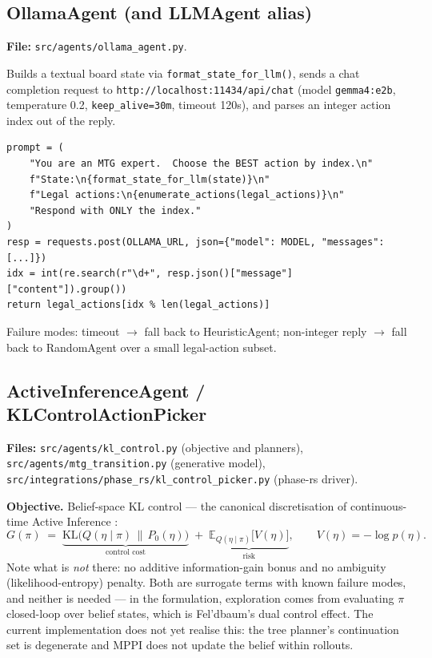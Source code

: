 \documentclass[11pt,a4paper]{article}
\begin{document}
\subsection{OllamaAgent (and LLMAgent alias)}
\textbf{File:} \texttt{src/agents/ollama\_agent.py}.

Builds a textual board state via \texttt{format\_state\_for\_llm()}, sends a
chat completion request to \texttt{http://localhost:11434/api/chat}
(model \texttt{gemma4:e2b}, temperature 0.2, \texttt{keep\_alive=30m},
timeout 120s), and parses an integer action index out of the reply.

\begin{lstlisting}
prompt = (
    "You are an MTG expert.  Choose the BEST action by index.\n"
    f"State:\n{format_state_for_llm(state)}\n"
    f"Legal actions:\n{enumerate_actions(legal_actions)}\n"
    "Respond with ONLY the index."
)
resp = requests.post(OLLAMA_URL, json={"model": MODEL, "messages": [...]})
idx = int(re.search(r"\d+", resp.json()["message"]["content"]).group())
return legal_actions[idx % len(legal_actions)]
\end{lstlisting}
%
Failure modes: timeout $\to$ fall back to HeuristicAgent; non-integer
reply $\to$ fall back to RandomAgent over a small legal-action subset.

\subsection{ActiveInferenceAgent / KLControlActionPicker}

\textbf{Files:} \texttt{src/agents/kl\_control.py} (objective and planners),
\texttt{src/agents/mtg\_transition.py} (generative model),
\texttt{src/integrations/phase\_rs/kl\_control\_picker.py} (phase-rs driver).

\medskip\noindent\textbf{Objective.} Belief-space KL control --- the
canonical discretisation of continuous-time Active Inference
\cite{kaufmann2026aifcontrol}:
%
\begin{equation}
G(\pi) \;=\; \underbrace{\mathrm{KL}\!\big(Q(\eta\mid\pi)\,\|\,P_0(\eta)\big)}_{\text{control cost}}
            \;+\; \underbrace{\mathbb{E}_{Q(\eta\mid\pi)}\!\big[V(\eta)\big]}_{\text{risk}},
\qquad V(\eta) = -\log p(\eta).
\label{eq:tech-kl}
\end{equation}
%
Note what is \emph{not} there: no additive information-gain bonus and no
ambiguity (likelihood-entropy) penalty. Both are surrogate terms with
known failure modes, and neither is needed --- in the formulation,
exploration comes from evaluating $\pi$ closed-loop over belief states,
which is Fel'dbaum's dual control effect. The current implementation does
not yet realise this: the tree planner's continuation set is degenerate and
MPPI does not update the belief within rollouts.
\end{document}
